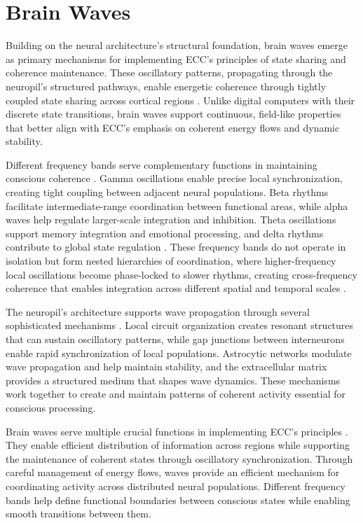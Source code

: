 \section{Brain Waves}

Building on the neural architecture's structural foundation, brain waves emerge as primary mechanisms for implementing ECC's principles of state sharing and coherence maintenance. These oscillatory patterns, propagating through the neuropil's structured pathways, enable energetic coherence through tightly coupled state sharing across cortical regions \cite{Buzsaki2004}. Unlike digital computers with their discrete state transitions, brain waves support continuous, field-like properties that better align with ECC's emphasis on coherent energy flows and dynamic stability.

Different frequency bands serve complementary functions in maintaining conscious coherence \cite{Wang2010}. Gamma oscillations enable precise local synchronization, creating tight coupling between adjacent neural populations. Beta rhythms facilitate intermediate-range coordination between functional areas, while alpha waves help regulate larger-scale integration and inhibition. Theta oscillations support memory integration and emotional processing, and delta rhythms contribute to global state regulation \cite{Steriade2006}. These frequency bands do not operate in isolation but form nested hierarchies of coordination, where higher-frequency local oscillations become phase-locked to slower rhythms, creating cross-frequency coherence that enables integration across different spatial and temporal scales \cite{Canolty2010}.

The neuropil's architecture supports wave propagation through several sophisticated mechanisms \cite{Buzsaki2006}. Local circuit organization creates resonant structures that can sustain oscillatory patterns, while gap junctions between interneurons enable rapid synchronization of local populations. Astrocytic networks modulate wave propagation and help maintain stability, and the extracellular matrix provides a structured medium that shapes wave dynamics. These mechanisms work together to create and maintain patterns of coherent activity essential for conscious processing.

Brain waves serve multiple crucial functions in implementing ECC's principles \cite{Varela2001}. They enable efficient distribution of information across regions while supporting the maintenance of coherent states through oscillatory synchronization. Through careful management of energy flows, waves provide an efficient mechanism for coordinating activity across distributed neural populations. Different frequency bands help define functional boundaries between conscious states while enabling smooth transitions between them.


